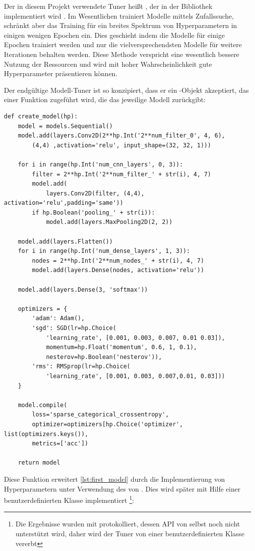 Der in diesem Projekt verwendete Tuner heißt  \cite{Li2018}, der in der Bibliothek  implementiert wird \cite{Google2019a}.
Im Wesentlichen trainiert  Modelle mittels Zufallssuche, schränkt aber das Training für ein breites Spektrum von Hyperparametern in einigen wenigen Epochen ein.
Dies geschieht indem die Modelle für einige Epochen trainiert werden und nur die vielversprechendsten Modelle für weitere Iterationen behalten werden.
Diese Methode verspricht eine wesentlich bessere Nutzung der Ressourcen und wird mit hoher Wahrscheinlichkeit gute Hyperparameter präsentieren können.

Der endgültige Modell-Tuner ist so konzipiert, dass er ein -Objekt akzeptiert, das einer Funktion zugeführt wird, die das jeweilige Modell zurückgibt:


\begin{lstlisting}
def create_model(hp):
    model = models.Sequential()
    model.add(layers.Conv2D(2**hp.Int('2**num_filter_0', 4, 6),
        (4,4) ,activation='relu', input_shape=(32, 32, 1)))

    for i in range(hp.Int('num_cnn_layers', 0, 3)):
        filter = 2**hp.Int('2**num_filter_' + str(i), 4, 7)
        model.add(
            layers.Conv2D(filter, (4,4), activation='relu',padding='same'))
        if hp.Boolean('pooling_' + str(i)):
            model.add(layers.MaxPooling2D(2, 2))

    model.add(layers.Flatten())
    for i in range(hp.Int('num_dense_layers', 1, 3)):
        nodes = 2**hp.Int('2**num_nodes_' + str(i), 4, 7)
        model.add(layers.Dense(nodes, activation='relu'))
    
    model.add(layers.Dense(3, 'softmax'))

    optimizers = {
        'adam': Adam(),
        'sgd': SGD(lr=hp.Choice(
            'learning_rate', [0.001, 0.003, 0.007, 0.01 0.03]),
            momentum=hp.Float('momentum', 0.6, 1, 0.1),
            nesterov=hp.Boolean('nesterov')),
        'rms': RMSprop(lr=hp.Choice(
            'learning_rate', [0.001, 0.003, 0.007,0.01, 0.03]))
    }

    model.compile(
        loss='sparse_categorical_crossentropy',
        optimizer=optimizers[hp.Choice('optimizer', list(optimizers.keys()),
        metrics=['acc'])

    return model
\end{lstlisting}

Diese Funktion erweitert \ref{lst:first_model} durch die Implementierung von Hyperparametern unter Verwendung des  von .
Dies wird später mit Hilfe einer benutzerdefinierten Klasse implementiert \footnote{Die Ergebnisse wurden mit  protokolliert, dessen API von  selbst noch nicht unterstützt wird, daher wird der Tuner von einer benutzerdefinierten Klasse vererbt}:

